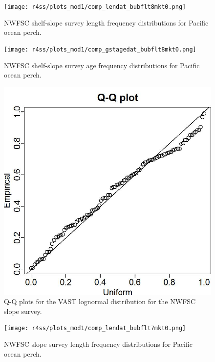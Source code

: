 \documentclass[12pt,]{article}
\begin{document}
\FloatBarrier

\begin{figure}
\centering
\texttt{[image: r4ss/plots\_mod1/comp\_lendat\_bubflt8mkt0.png]}
\caption{NWFSC shelf-slope survey length frequency distributions for
Pacific ocean perch. \label{fig:nw_Length}}
\end{figure}

\FloatBarrier

\begin{figure}
\centering
\texttt{[image: r4ss/plots\_mod1/comp\_gstagedat\_bubflt8mkt0.png]}
\caption{NWFSC shelf-slope survey age frequency distributions for
Pacific ocean perch. \label{fig:nw_Age}}
\end{figure}

\FloatBarrier

\begin{figure}
\centering
\includegraphics{Figures/Q-Q_plot_nw_slope_gammaECE.jpg}
\caption{Q-Q plots for the VAST lognormal distribution for the NWFSC
slope survey. \label{fig:nw_slope_qq}}
\end{figure}

\FloatBarrier

\begin{figure}
\centering
\texttt{[image: r4ss/plots\_mod1/comp\_lendat\_bubflt7mkt0.png]}
\caption{NWFSC slope survey length frequency distributions for Pacific
ocean perch. \label{fig:nw_slope_Length}}
\end{figure}
\end{document}
